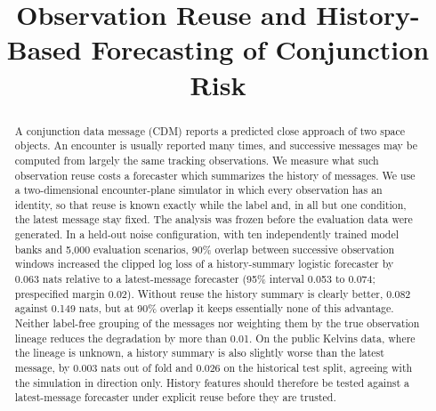 \documentclass[conference]{IEEEtran}
\begin{document}
\title{Observation Reuse and History-Based Forecasting of Conjunction Risk}

\author{
}

\maketitle

\begin{abstract}
A conjunction data message (CDM) reports a predicted close approach of two space objects. An encounter is usually reported many times, and successive messages may be computed from largely the same tracking observations. We measure what such observation reuse costs a forecaster which summarizes the history of messages. We use a two-dimensional encounter-plane simulator in which every observation has an identity, so that reuse is known exactly while the label and, in all but one condition, the latest message stay fixed. The analysis was frozen before the evaluation data were generated.
In a held-out noise configuration, with ten independently trained model banks and 5,000 evaluation scenarios, 90\% overlap between successive observation windows increased the clipped log loss of a history-summary logistic forecaster by 0.063 nats relative to a latest-message forecaster (95\% interval 0.053 to 0.074; prespecified margin 0.02).
Without reuse the history summary is clearly better, 0.082 against 0.149 nats, but at 90\% overlap it keeps essentially none of this advantage. Neither label-free grouping of the messages nor weighting them by the true observation lineage reduces the degradation by more than 0.01.
On the public Kelvins data, where the lineage is unknown, a history summary is also slightly worse than the latest message, by 0.003 nats out of fold and 0.026 on the historical test split, agreeing with the simulation in direction only. History features should therefore be tested against a latest-message forecaster under explicit reuse before they are trusted.
\end{abstract}
\end{document}
